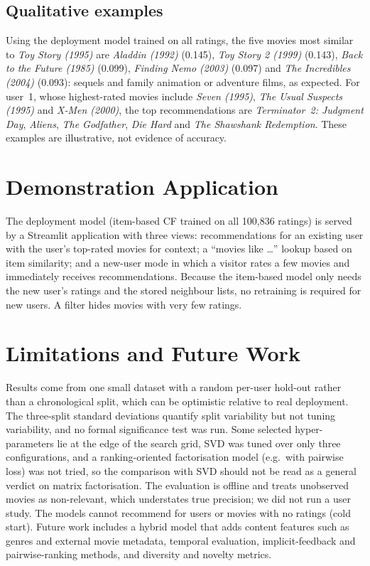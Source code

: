 \documentclass[conference]{IEEEtran}
\begin{document}
\subsection{Qualitative examples}
Using the deployment model trained on all ratings, the five movies most similar to \emph{Toy Story (1995)} are \emph{Aladdin (1992)} (0.145), \emph{Toy Story 2 (1999)} (0.143), \emph{Back to the Future (1985)} (0.099), \emph{Finding Nemo (2003)} (0.097) and \emph{The Incredibles (2004)} (0.093): sequels and family animation or adventure films, as expected. For user~1, whose highest-rated movies include \emph{Seven (1995)}, \emph{The Usual Suspects (1995)} and \emph{X-Men (2000)}, the top recommendations are \emph{Terminator~2: Judgment Day}, \emph{Aliens}, \emph{The Godfather}, \emph{Die Hard} and \emph{The Shawshank Redemption}. These examples are illustrative, not evidence of accuracy.

\section{Demonstration Application}
The deployment model (item-based CF trained on all 100,836 ratings) is served by a Streamlit application with three views: recommendations for an existing user with the user's top-rated movies for context; a ``movies like \ldots'' lookup based on item similarity; and a new-user mode in which a visitor rates a few movies and immediately receives recommendations. Because the item-based model only needs the new user's ratings and the stored neighbour lists, no retraining is required for new users. A filter hides movies with very few ratings.

\section{Limitations and Future Work}
Results come from one small dataset with a random per-user hold-out rather than a chronological split, which can be optimistic relative to real deployment. The three-split standard deviations quantify split variability but not tuning variability, and no formal significance test was run. Some selected hyper-parameters lie at the edge of the search grid, SVD was tuned over only three configurations, and a ranking-oriented factorisation model (e.g.\ with pairwise loss) was not tried, so the comparison with SVD should not be read as a general verdict on matrix factorisation. The evaluation is offline and treats unobserved movies as non-relevant, which understates true precision; we did not run a user study. The models cannot recommend for users or movies with no ratings (cold start). Future work includes a hybrid model that adds content features such as genres and external movie metadata, temporal evaluation, implicit-feedback and pairwise-ranking methods, and diversity and novelty metrics.
\end{document}
